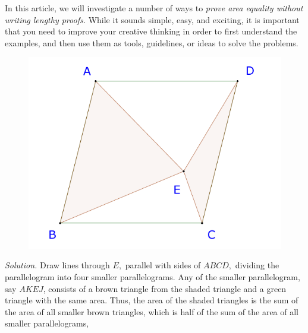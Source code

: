 \begin{multicols}{2}
	\setlength{\abovedisplayskip}{6pt}
	\setlength{\belowdisplayskip}{6pt}
	In this article, we will investigate a number of ways to \textit{prove area equality without writing lengthy proofs.}
	While it sounds simple, easy, and exciting, it is important that you need to improve your creative thinking in order to 
	first understand the examples, and then use them as tools, guidelines, or ideas to solve the problems.
	\vskip 0.2cm
	\begin{figure}[H]
		\vspace*{-10pt}
		\centering
		\captionsetup{labelformat= empty, justification=centering}
		\includegraphics[width= 1\linewidth]{23-24-s3-i-p1.pdf}
		\vspace*{-20pt} 
	\end{figure}
	\textit{Solution.}
	Draw lines through $E,$ parallel with sides of $ABCD,$ dividing the parallelogram into four smaller parallelograms.
	Any of the smaller parallelogram, say $AKEJ$, consists of a brown triangle from the shaded triangle and a green triangle with the same area.
	Thus, the area of the shaded triangles is the sum of the area of all smaller brown triangles, which is half of the sum of the area of all smaller parallelograms,

\end{multicols}
